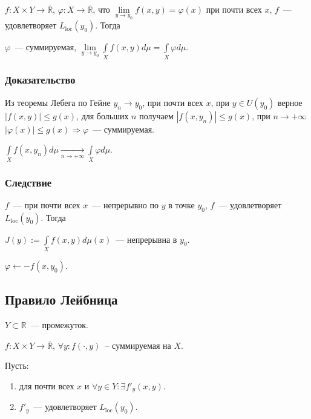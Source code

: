 \documentclass{article}
\begin{document}
        $f : X \times Y \rightarrow \overline{\mathbb{R}}$, $\varphi : X \rightarrow \overline{\mathbb{R}}$, что $\lim\limits_{y \rightarrow y_0} f(x, y) = \varphi(x)$ при почти всех $x$, $f$~--- удовлетворяет $L_{\mathrm{loc}} (y_0)$. Тогда 
        
        $\varphi$~--- суммируемая, $\lim\limits_{y \rightarrow y_0} \int\limits_X f(x, y) d \mu = \int\limits_X \varphi d \mu$.
    
        \subsubsection{Доказательство}
        
            Из теоремы Лебега по Гейне $y_n \rightarrow y_0$, при почти всех $x$, при $y \in U(y_0)$ верное $\left| f(x, y) \right| \leqslant g(x)$, для больших $n$ получаем $\left| f(x, y_n) \right| \leqslant g(x)$, при $n \rightarrow +\infty$ $\left| \varphi(x) \right| \leqslant g(x) \Rightarrow \varphi$~--- суммируемая.
            
            $\int\limits_X f(x, y_n) d \mu \xrightarrow[n \rightarrow +\infty]{} \int\limits_X \varphi d \mu$.
            
        \subsubsection{Следствие}
        
            $f$~--- при почти всех $x$~--- непрерывно по $y$ в точке $y_0$, $f$~--- удовлетворяет $L_{\mathrm{loc}}(y_0)$. Тогда
            
            $J(y) := \int\limits_X f(x, y) d \mu (x)$~--- непрерывна в $y_0$.
            
            $\varphi \leftarrow -f(x, y_0)$.
            
    \subsection{Правило Лейбница}
    
        $Y \subset \mathbb{R}$~--- промежуток.
        
        $f : X \times Y \rightarrow \overline{\mathbb{R}}$, $\forall y : f (\cdot, y)$~-- суммируемая на $X$. 
        
        Пусть:
        
        \begin{enumerate}
        
            \item для почти всех $x$ и $\forall y \in Y : \exists f'_y(x, y)$.
            
            \item $f'_y$~--- удовлетворяет $L_{\mathrm{loc}}(y_0)$.
            
        \end{enumerate}
        
\end{document}
